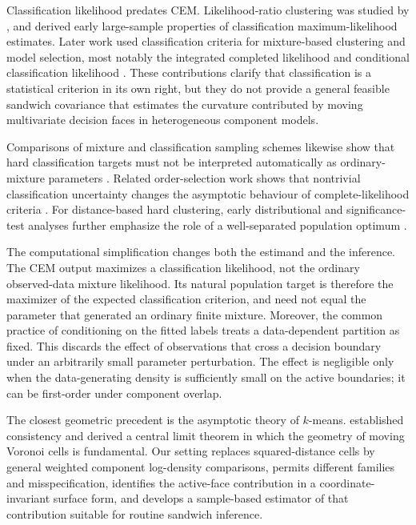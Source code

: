 \documentclass[12pt,a4paper]{article}
\theoremstyle{definition}
\theoremstyle{remark}
\begin{document}
Classification likelihood predates CEM. Likelihood-ratio clustering was
studied by \citet{scott1971clustering}, and
\citet{bryant1978classification} derived early large-sample properties of
classification maximum-likelihood estimates. Later work used classification
criteria for mixture-based clustering and model selection, most notably the
integrated completed likelihood \citep{biernacki2000icl} and conditional
classification likelihood \citep{baudry2015conditional}. These contributions
clarify that classification is a statistical criterion in its own right, but
they do not provide a general feasible sandwich covariance that estimates the
curvature contributed by moving multivariate decision faces in heterogeneous
component models.

Comparisons of mixture and classification sampling schemes likewise show that
hard classification targets must not be interpreted automatically as
ordinary-mixture parameters \citep{ganesalingam1989classification}. Related
order-selection work shows that nontrivial classification uncertainty changes
the asymptotic behaviour of complete-likelihood criteria \citep{hui2015order}.
For distance-based hard clustering, early distributional and
significance-test analyses further emphasize the role of a well-separated
population optimum \citep{hartigan1978asymptotic,bock1985probabilistic}.

The computational simplification changes both the estimand and the inference.
The CEM output maximizes a classification likelihood, not the ordinary
observed-data mixture likelihood.  Its natural population target is therefore
the maximizer of the expected classification criterion, and need not equal the
parameter that generated an ordinary finite mixture.  Moreover, the common
practice of conditioning on the fitted labels treats a data-dependent
partition as fixed.  This discards the effect of observations that cross a
decision boundary under an arbitrarily small parameter perturbation.  The
effect is negligible only when the data-generating density is sufficiently
small on the active boundaries; it can be first-order under component overlap.

The closest geometric precedent is the asymptotic theory of $k$-means.
\citet{pollard1981strong} established consistency and
\citet{pollard1982clt} derived a central limit theorem in which the geometry of
moving Voronoi cells is fundamental. Our setting replaces squared-distance
cells by general weighted component log-density comparisons, permits different
families and misspecification, identifies the active-face contribution in a
coordinate-invariant surface form, and develops a sample-based estimator of
that contribution suitable for routine sandwich inference.
\end{document}

